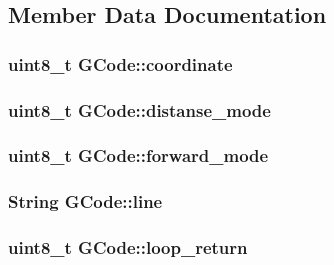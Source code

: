 \subsection{Member Data Documentation}
\hypertarget{class_g_code_a4311a77cb2efcc0bce0c582ae80755e1}{
\subsubsection[{coordinate}]{\setlength{\rightskip}{0pt plus 5cm}uint8\+\_\+t G\+Code\+::coordinate}}\label{class_g_code_a4311a77cb2efcc0bce0c582ae80755e1}
\hypertarget{class_g_code_a77dad1d8057ecc38242757923a2bb87f}{
\subsubsection[{distanse\+\_\+mode}]{\setlength{\rightskip}{0pt plus 5cm}uint8\+\_\+t G\+Code\+::distanse\+\_\+mode}}\label{class_g_code_a77dad1d8057ecc38242757923a2bb87f}
\hypertarget{class_g_code_acbf5f3b9aeffe27d3f87e9d57b487146}{
\subsubsection[{forward\+\_\+mode}]{\setlength{\rightskip}{0pt plus 5cm}uint8\+\_\+t G\+Code\+::forward\+\_\+mode}}\label{class_g_code_acbf5f3b9aeffe27d3f87e9d57b487146}
\hypertarget{class_g_code_a20d7c90740e9e139b24f68336ad8c8f1}{
\subsubsection[{line}]{\setlength{\rightskip}{0pt plus 5cm}String G\+Code\+::line}}\label{class_g_code_a20d7c90740e9e139b24f68336ad8c8f1}
\hypertarget{class_g_code_a600deaa28b54bd8fca4d8eb51fb09b55}{
\subsubsection[{loop\+\_\+return}]{\setlength{\rightskip}{0pt plus 5cm}uint8\+\_\+t G\+Code\+::loop\+\_\+return}}\label{class_g_code_a600deaa28b54bd8fca4d8eb51fb09b55}
